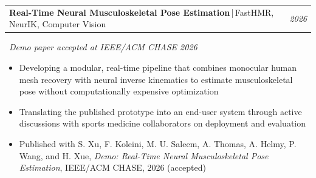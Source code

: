 \documentclass[10pt]{article}
\makeatletter
\newcommand{\projectheading}[3]{%
  \noindent\begin{tabularx}{\textwidth}{@{}X>{\raggedleft\arraybackslash}p{7em}@{}}
    \textbf{\large #1}\,|\,\normalfont #2 & \emph{#3}
  \end{tabularx}\par\nopagebreak
}
\makeatother
\begin{document}
\projectheading{Real-Time Neural Musculoskeletal Pose Estimation}{FastHMR, NeurIK, Computer Vision}{2026}
\noindent\raisebox{-0.2\height}\faFileInvoice\ \textit{Demo paper accepted at IEEE/ACM CHASE 2026}
\begin{itemize}
        \item[{\color[RGB]{10,0,254}$\bullet$}] Developing a modular, real-time pipeline that combines monocular human mesh recovery with neural inverse kinematics to estimate musculoskeletal pose without computationally expensive optimization
        \item[{\color[RGB]{10,0,254}$\bullet$}] Translating the published prototype into an end-user system through active discussions with sports medicine collaborators on deployment and evaluation
        \item[{\color[RGB]{10,0,254}$\bullet$}] Published with S. Xu, F. Koleini, M. U. Saleem, A. Thomas, A. Helmy, P. Wang, and H. Xue, \textit{Demo: Real-Time Neural Musculoskeletal Pose Estimation}, IEEE/ACM CHASE, 2026 (accepted)
\end{itemize}
\end{document}
